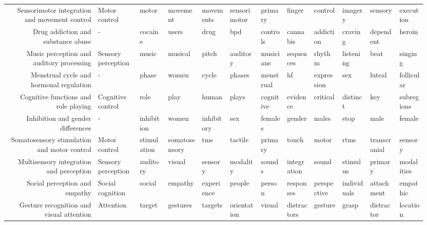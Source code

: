 \documentclass[english]{article}
\begin{document}
\begin{landscape}
\begin{supertabular}{rlllllllllll}
Sensorimotor integration and movement control &       Motor control &            motor &      movement &       movements &   sensorimotor &     primary &         finger &       control &        imagery &       sensory &      execution \\
  Drug addiction and substance abuse &                   - &          cocaine &         users &            drug &            bpd &    controls &       cannabis &     addiction &        craving &     dependent &         heroin \\
Music perception and auditory processing &  Sensory perception &            music &       musical &           pitch &       auditory &   musicians &      sequences &        rhythm &      listening &          beat &        singing \\
Menstrual cycle and hormonal regulation &                   - &            phase &         women &           cycle &         phases &   menstrual &             hf &    expression &            sex &        luteal &     follicular \\
Cognitive functions and role playing &   Cognitive control &             role &          play &           human &          plays &   cognitive &       evidence &      critical &       distinct &           key &     subregions \\
   Inhibition and gender differences &                   - &       inhibition &         women &      inhibitory &            sex &     females &         gender &         males &           stop &          male &         female \\
Somatosensory stimulation and motor control &       Motor control &      stimulation & somatosensory &             tms &        tactile &     primary &          touch &         motor &           rtms &  transcranial &        sensory \\
Multisensory integration and perception &  Sensory perception &         auditory &        visual &         sensory &       modality &      sounds &    integration &         sound &       stimulus &       primary &     modalities \\
       Social perception and empathy &    Social cognition &           social &       empathy &      experience &         people &      person &      responses &   perspective &    individuals &    attachment &       empathic \\
Gesture recognition and visual attention &           Attention &           target &      gestures &         targets &    orientation &      visual &    distractors &       gesture &          grasp &    distractor &       location \\

\end{supertabular}
\end{landscape}
\end{document}

